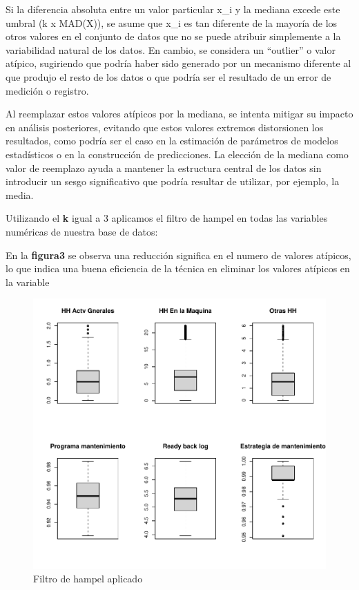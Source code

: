 \documentclass[
  11pt,
  bookmarksnumbered]{article}
\begin{document}
Si la diferencia absoluta entre un valor particular x\_i y la mediana excede este umbral (k x MAD(X)), se asume que x\_i es tan diferente de la mayoría de los otros valores en el conjunto de datos que no se puede atribuir simplemente a la variabilidad natural de los datos.
En cambio, se considera un ``outlier'' o valor atípico, sugiriendo que podría haber sido generado por un mecanismo diferente al que produjo el resto de los datos o que podría ser el resultado de un error de medición o registro.

Al reemplazar estos valores atípicos por la mediana, se intenta mitigar su impacto en análisis posteriores, evitando que estos valores extremos distorsionen los resultados, como podría ser el caso en la estimación de parámetros de modelos estadísticos o en la construcción de predicciones.
La elección de la mediana como valor de reemplazo ayuda a mantener la estructura central de los datos sin introducir un sesgo significativo que podría resultar de utilizar, por ejemplo, la media.

Utilizando el \textbf{k} igual a 3 aplicamos el filtro de hampel en todas las variables numéricas de nuestra base de datos:

En la \textbf{figura3} se observa una reducción significa en el numero de valores atípicos, lo que indica una buena eficiencia de la técnica en eliminar los valores atípicos en la variable

\begin{figure}
\centering
\includegraphics{trabajo_files/figure-latex/unnamed-chunk-10-1.pdf}
\caption{\label{fig:unnamed-chunk-10}Filtro de hampel aplicado}
\end{figure}
\end{document}
